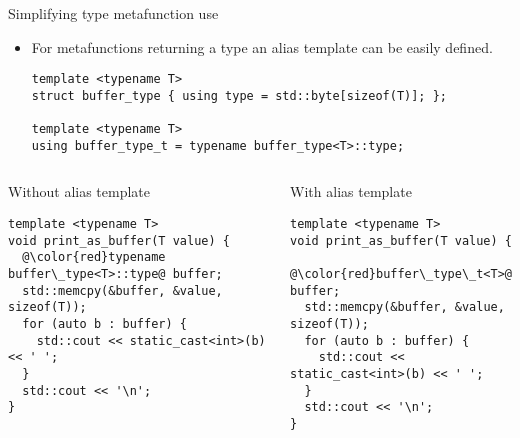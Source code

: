 \begin{frame}[t,fragile]{Simplifying type metafunction use}
\begin{itemize}
  \item For metafunctions returning a type an alias template can be easily defined.
\begin{lstlisting}
template <typename T>
struct buffer_type { using type = std::byte[sizeof(T)]; };

template <typename T>
using buffer_type_t = typename buffer_type<T>::type;
\end{lstlisting}
\end{itemize}

\begin{columns}[T]

\begin{block}{Without alias template}
\begin{lstlisting}[basicstyle=\tiny,escapechar=@]
template <typename T>
void print_as_buffer(T value) {
  @\color{red}typename buffer\_type<T>::type@ buffer;
  std::memcpy(&buffer, &value, sizeof(T));
  for (auto b : buffer) {
    std::cout << static_cast<int>(b) << ' ';
  }
  std::cout << '\n';
}
\end{lstlisting}
\end{block}

\begin{block}{With alias template}
\begin{lstlisting}[basicstyle=\tiny,escapechar=@]
template <typename T>
void print_as_buffer(T value) {
  @\color{red}buffer\_type\_t<T>@ buffer;
  std::memcpy(&buffer, &value, sizeof(T));
  for (auto b : buffer) {
    std::cout << static_cast<int>(b) << ' ';
  }
  std::cout << '\n';
}
\end{lstlisting}
\end{block}

\end{columns}
\end{frame}

